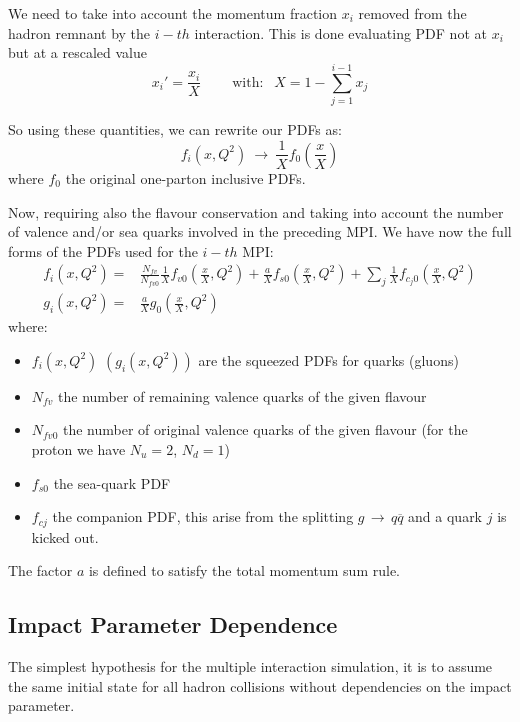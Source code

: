 We need to take into account the momentum fraction $x_i$ removed from the hadron remnant by the $i-th$ interaction. This is done evaluating PDF not at $x_i$ but at a rescaled value
\begin{equation}
	x_i'=\frac{x_i}{X} \qquad \ \text{with: }\ \ X=1-\sum_{j=1}^{i-1}x_j
\end{equation}

So using these quantities, we can rewrite our PDFs as:
\begin{equation}
	f_i(x,Q^2)\ \longrightarrow\ \frac{1}{X}f_0\left(\frac{x}{X}\right)
\end{equation}
where $f_0$ the original one-parton inclusive PDFs.

Now, requiring also the flavour conservation and taking into account the number of valence and/or sea quarks involved in the preceding MPI. We have now the full forms of the PDFs used for the $i-th$ MPI:
\begin{align}
f_i(x,Q^2) =&  \frac{N_{fv}}{N_{fv0}}\frac{1}{X} f_{v0}\left( \frac{x}{X},Q^2 \right) + \frac{a}{X}f_{s0}\left( \frac{x}{X},Q^2 \right)+\displaystyle\sum_j \frac{1}{X} f_{c_j0}\left( \frac{x}{X},Q^2 \right) \\
g_i(x,Q^2) =& \frac{a}{X}g_0\left( \frac{x}{X},Q^2 \right) 
\end{align}
where: 
\begin{itemize}
	\item $f_i(x,Q^2)$ $(g_i(x,Q^2))$ are the squeezed PDFs for quarks (gluons)
	\item $N_{fv}$ the number of remaining valence quarks of the given flavour
	\item $N_{fv0}$ the number of original valence quarks of the given flavour (for the proton we have $N_u=2$, $N_d=1$)
	\item $f_{s0}$ the sea-quark PDF
	\item $f_{cj}$ the companion PDF, this arise from the splitting $g\,\rightarrow\,q\overline{q}$ and a quark $j$ is kicked out.
\end{itemize}
The factor $a$ is defined to satisfy the total momentum sum rule.

\subsection{Impact Parameter Dependence}

The simplest hypothesis for the multiple interaction simulation, it is to assume the same initial state for all hadron collisions without dependencies on the impact parameter. 

